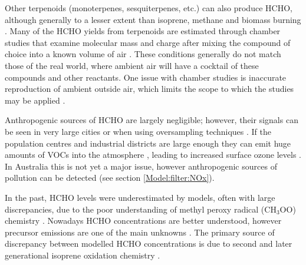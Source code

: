     Other terpenoids (monoterpenes, sesquiterpenes, etc.) can also produce HCHO, although generally to a lesser extent than isoprene, methane and biomass burning \parencite{Guenther2012}.
    Many of the HCHO yields from terpenoids are estimated through chamber studies that examine molecular mass and charge after mixing the compound of choice into a known volume of air \parencite[eg.][]{Nguyen2014}.
    These conditions generally do not match those of the real world, where ambient air will have a cocktail of these compounds and other reactants.
    One issue with chamber studies is inaccurate reproduction of ambient outside air, which limits the scope to which the studies may be applied \parencite{Nguyen2014}.
    
    Anthropogenic sources of HCHO are largely negligible; however, their signals can be seen in very large cities or when using oversampling techniques \parencite{Millet2008,Zhu2014}.
    If the population centres and industrial districts are large enough they can emit huge amounts of VOCs into the atmosphere \parencite{Fu2007}, leading to increased surface ozone levels \parencite{Zhu2014}.
    In Australia this is not yet a major issue, however anthropogenic sources of pollution can be detected (see section \ref{Model:filter:NOx}).
    
    In the past, HCHO levels were underestimated by models, often with large discrepancies, due to the poor understanding of methyl peroxy radical (CH$_3$OO) chemistry \parencite{Wagner2002}.
    Nowadays HCHO concentrations are better understood, however precursor emissions are one of the main unknowns \parencite[eg.][]{Emmerson2016,Marvin2017}.
    The primary source of discrepancy between modelled HCHO concentrations is due to second and later generational isoprene oxidation chemistry \parencite{Marvin2017}.

